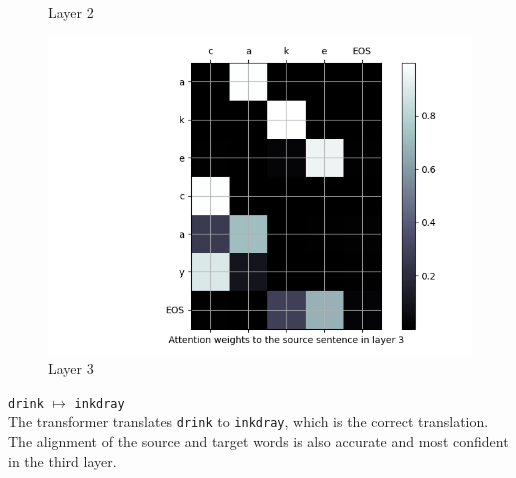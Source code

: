 \begin{enumarabic}
\begin{figure}[H]
\begin{minipage}[b]{0.33\textwidth}
        \caption{Layer 2}
        \label{fig:cake-1}
      \end{minipage}
      \begin{minipage}[b]{0.33\textwidth}
        \centering
        \includegraphics[width=\textwidth]{figures/cake-2.png}
        \caption{Layer 3}
        \label{fig:cake-2}
      \end{minipage}
    \end{figure}

  \item \verb|drink| $\mapsto$ \verb|inkdray| \\
    The transformer translates \verb|drink| to \verb|inkdray|, which is the correct translation.
    The alignment of the source and target words is also accurate and most confident
    in the third layer.


\end{enumarabic}
